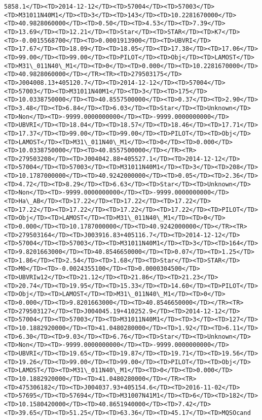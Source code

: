 \documentclass[11pt]{article}
\begin{document}
\begin{Verbatim}[commandchars=\\\{\}]
5858.1</TD><TD>2014-12-12</TD><TD>57004</TD><TD>57003</TD><TD>M31011N40M1</TD><TD>3</TD><TD>143</TD><TD>10.2281670000</TD><TD>40.9828060000</TD><TD>0.50</TD><TD>4.53</TD><TD>7.39</TD><TD>13.69</TD><TD>12.21</TD><TD>Star</TD><TD>STAR</TD><TD>K7</TD><TD>-0.0015568700</TD><TD>0.0001913900</TD><TD>UBVRI</TD><TD>17.67</TD><TD>18.09</TD><TD>18.05</TD><TD>17.38</TD><TD>17.06</TD><TD>99.00</TD><TD>99.00</TD><TD>PILOT</TD><TD>Obj</TD><TD>LAMOST</TD><TD>M31\_011N40\_M1</TD><TD>0</TD><TD>0.000</TD><TD>10.2281670000</TD><TD>40.9828060000</TD></TR><TR><TD>279503175</TD><TD>J004008.13+405120.7</TD><TD>2014-12-12</TD><TD>57004</TD><TD>57003</TD><TD>M31011N40M1</TD><TD>3</TD><TD>175</TD><TD>10.0338750000</TD><TD>40.8557500000</TD><TD>0.37</TD><TD>2.90</TD><TD>3.48</TD><TD>6.84</TD><TD>6.03</TD><TD>Star</TD><TD>Unknown</TD><TD>Non</TD><TD>-9999.0000000000</TD><TD>-9999.0000000000</TD><TD>UBVRI</TD><TD>18.04</TD><TD>18.57</TD><TD>18.46</TD><TD>17.71</TD><TD>17.37</TD><TD>99.00</TD><TD>99.00</TD><TD>PILOT</TD><TD>Obj</TD><TD>LAMOST</TD><TD>M31\_011N40\_M1</TD><TD>0</TD><TD>0.000</TD><TD>10.0338750000</TD><TD>40.8557500000</TD></TR><TR><TD>279503208</TD><TD>J004042.88+405527.1</TD><TD>2014-12-12</TD><TD>57004</TD><TD>57003</TD><TD>M31011N40M1</TD><TD>3</TD><TD>208</TD><TD>10.1787000000</TD><TD>40.9242000000</TD><TD>0.05</TD><TD>2.36</TD><TD>4.72</TD><TD>8.29</TD><TD>6.63</TD><TD>Star</TD><TD>Unknown</TD><TD>Non</TD><TD>-9999.0000000000</TD><TD>-9999.0000000000</TD><TD>Ha\_AB</TD><TD>17.22</TD><TD>17.22</TD><TD>17.22</TD><TD>17.22</TD><TD>17.22</TD><TD>17.22</TD><TD>17.22</TD><TD>PILOT</TD><TD>Obj</TD><TD>LAMOST</TD><TD>M31\_011N40\_M1</TD><TD>0</TD><TD>0.000</TD><TD>10.1787000000</TD><TD>40.9242000000</TD></TR><TR><TD>279503164</TD><TD>J003916.83+405116.7</TD><TD>2014-12-12</TD><TD>57004</TD><TD>57003</TD><TD>M31011N40M1</TD><TD>3</TD><TD>164</TD><TD>9.8201663000</TD><TD>40.8546650000</TD><TD>0.07</TD><TD>1.25</TD><TD>1.86</TD><TD>2.54</TD><TD>1.68</TD><TD>Star</TD><TD>STAR</TD><TD>M0</TD><TD>-0.0024355100</TD><TD>0.0000304500</TD><TD>UBVRIw12</TD><TD>21.12</TD><TD>21.86</TD><TD>21.23</TD><TD>20.74</TD><TD>19.95</TD><TD>15.33</TD><TD>14.60</TD><TD>PILOT</TD><TD>Obj</TD><TD>LAMOST</TD><TD>M31\_011N40\_M1</TD><TD>0</TD><TD>0.000</TD><TD>9.8201663000</TD><TD>40.8546650000</TD></TR><TR><TD>279503127</TD><TD>J004045.19+410252.9</TD><TD>2014-12-12</TD><TD>57004</TD><TD>57003</TD><TD>M31011N40M1</TD><TD>3</TD><TD>127</TD><TD>10.1882920000</TD><TD>41.0480280000</TD><TD>1.92</TD><TD>6.11</TD><TD>6.30</TD><TD>9.03</TD><TD>6.76</TD><TD>Star</TD><TD>Unknown</TD><TD>Non</TD><TD>-9999.0000000000</TD><TD>-9999.0000000000</TD><TD>UBVRI</TD><TD>19.65</TD><TD>19.87</TD><TD>19.71</TD><TD>19.56</TD><TD>19.26</TD><TD>99.00</TD><TD>99.00</TD><TD>PILOT</TD><TD>Obj</TD><TD>LAMOST</TD><TD>M31\_011N40\_M1</TD><TD>0</TD><TD>0.000</TD><TD>10.1882920000</TD><TD>41.0480280000</TD></TR><TR><TD>475306182</TD><TD>J004037.93+405154.6</TD><TD>2016-11-02</TD><TD>57695</TD><TD>57694</TD><TD>M31007N41M1</TD><TD>6</TD><TD>182</TD><TD>10.1580420000</TD><TD>40.8651940000</TD><TD>7.42</TD><TD>39.65</TD><TD>51.25</TD><TD>63.36</TD><TD>45.17</TD><TD>MQSOcand  
\end{Verbatim}
\end{document}
